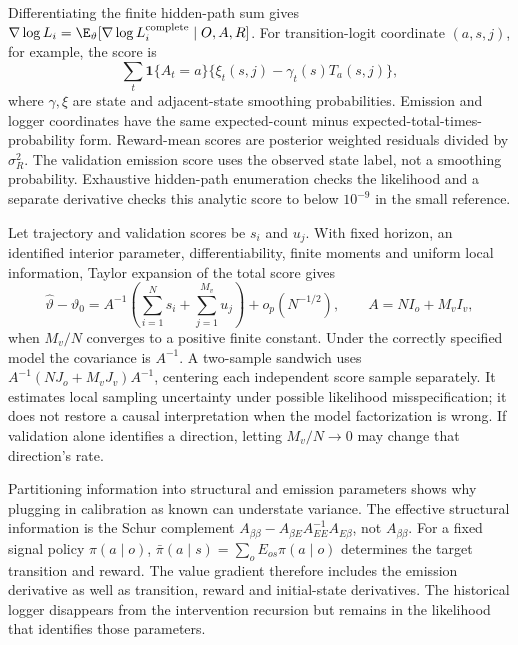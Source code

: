Differentiating the finite hidden-path sum gives
$\nabla\log L_i=\E_\vartheta[\nabla\log L_i^{\rm complete}\mid O,A,R]$.
For transition-logit coordinate $(a,s,j)$, for example, the score is
\[
 \sum_t\mathbf1\{A_t=a\}
 \{\xi_t(s,j)-\gamma_t(s)T_a(s,j)\},
\]
where $\gamma,\xi$ are state and adjacent-state smoothing probabilities.
Emission and logger coordinates have the same expected-count minus
expected-total-times-probability form. Reward-mean scores are posterior
weighted residuals divided by $\sigma_R^2$. The validation emission score
uses the observed state label, not a smoothing probability. Exhaustive
hidden-path enumeration checks the likelihood and a separate derivative
checks this analytic score to below $10^{-9}$ in the small reference.

Let trajectory and validation scores be $s_i$ and $u_j$. With fixed horizon,
an identified interior parameter, differentiability, finite moments and
uniform local information, Taylor expansion of the total score gives
\[
 \hat\vartheta-\vartheta_0=
 A^{-1}\left(\sum_{i=1}^Ns_i+\sum_{j=1}^{M_v}u_j\right)
 +o_p(N^{-1/2}),\qquad
 A=N I_o+M_v I_v,
\]
when $M_v/N$ converges to a positive finite constant. Under the correctly
specified model the covariance is $A^{-1}$. A two-sample sandwich uses
$A^{-1}(N J_o+M_v J_v)A^{-1}$, centering each independent score sample
separately. It estimates local sampling uncertainty under possible
likelihood misspecification; it does not restore a causal interpretation
when the model factorization is wrong. If validation alone identifies a
direction, letting $M_v/N\to0$ may change that direction's rate.

Partitioning information into structural and emission parameters shows why
plugging in calibration as known can understate variance. The effective
structural information is the Schur complement
$A_{\beta\beta}-A_{\beta E}A_{EE}^{-1}A_{E\beta}$, not
$A_{\beta\beta}$. For a fixed signal policy $\pi(a\mid o)$,
$\bar\pi(a\mid s)=\sum_oE_{os}\pi(a\mid o)$ determines the target
transition and reward. The value gradient therefore includes the emission
derivative as well as transition, reward and initial-state derivatives.
The historical logger disappears from the intervention recursion but remains
in the likelihood that identifies those parameters.

